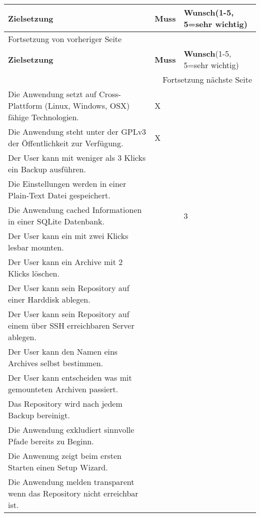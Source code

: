 \documentclass[a4paper,11pt]{article}
\begin{document}
\begin{longtable}{|p{9cm}|p{1.5cm}|p{2cm}|}
\hline
\textbf{Zielsetzung}\cellcolor[HTML]{C0C0C0} & \textbf{Muss}\cellcolor[HTML]{C0C0C0} & \textbf{Wunsch}\newline (1-5, 5=sehr wichtig)\cellcolor[HTML]{C0C0C0}\\
\hline
\endfirsthead
\multicolumn{3}{l}{Fortsetzung von vorheriger Seite} \\
\hline

\textbf{Zielsetzung}\cellcolor[HTML]{C0C0C0} & \textbf{Muss}\cellcolor[HTML]{C0C0C0} & \textbf{Wunsch}\newline (1-5, 5=sehr wichtig)\cellcolor[HTML]{C0C0C0} \\

\hline
\endhead
\hline\multicolumn{3}{r}{Fortsetzung nächste Seite} \\
\endfoot
\endlastfoot
\hline
Die Anwendung setzt auf Cross-Plattform (Linux, Windows, OSX) fähige Technologien. & X & \\
\hline
Die Anwendung steht unter der GPLv3 der Öffentlichkeit zur Verfügung. & X & \\
\hline
Der User kann mit weniger als 3 Klicks ein Backup ausführen. &  & \\
\hline
Die Einstellungen werden in einer Plain-Text Datei gespeichert. &  & \\
\hline
Die Anwendung cached Informationen in einer SQLite Datenbank. &  & 3\\
\hline
Der User kann ein mit zwei Klicks lesbar mounten. &  & \\
\hline
Der User kann ein Archive mit 2 Klicks löschen. &  & \\
\hline
Der User kann sein Repository auf einer Harddisk ablegen. &  & \\
\hline
Der User kann sein Repository auf einem über SSH erreichbaren Server ablegen. &  & \\
\hline
Der User kann den Namen eins Archives selbst bestimmen. &  & \\
\hline
Der User kann entscheiden was mit gemounteten Archiven passiert. &  & \\
\hline
Das Repository wird nach jedem Backup bereinigt. &  & \\
\hline
Die Anwendung exkludiert sinnvolle Pfade bereits zu Beginn. &  & \\
\hline
Die Anwenung zeigt beim ersten Starten einen Setup Wizard. &  & \\
\hline
Die Anwendung melden transparent wenn das Repository nicht erreichbar ist. &  & \\

\end{longtable}
\end{document}
